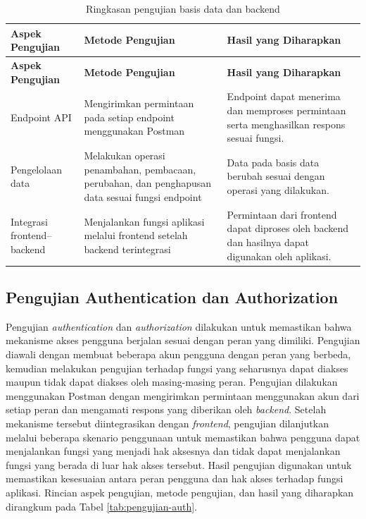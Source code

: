 \begin{longtable}{|p{3.2cm}|p{4.0cm}|p{4.0cm}|}
    \caption{Ringkasan pengujian basis data dan backend}
    \label{tab:pengujian-backend} \\
    \hline
    \textbf{Aspek Pengujian} & \textbf{Metode Pengujian} & \textbf{Hasil yang Diharapkan} \\
    \hline
    \endfirsthead

    \hline
    \textbf{Aspek Pengujian} & \textbf{Metode Pengujian} & \textbf{Hasil yang Diharapkan} \\
    \hline
    \endhead

    Endpoint API &
    Mengirimkan permintaan pada setiap endpoint menggunakan Postman &
    Endpoint dapat menerima dan memproses permintaan serta menghasilkan respons sesuai fungsi. \\
    \hline

    \hline
    Pengelolaan data &
    Melakukan operasi penambahan, pembacaan, perubahan, dan penghapusan data sesuai fungsi endpoint &
    Data pada basis data berubah sesuai dengan operasi yang dilakukan. \\
    \hline
    Integrasi frontend--backend &
    Menjalankan fungsi aplikasi melalui frontend setelah backend terintegrasi &
    Permintaan dari frontend dapat diproses oleh backend dan hasilnya dapat digunakan oleh aplikasi. \\
    \hline
\end{longtable}

\subsection{Pengujian Authentication dan Authorization}

Pengujian \textit{authentication} dan \textit{authorization} dilakukan untuk memastikan bahwa mekanisme akses pengguna berjalan sesuai dengan peran yang dimiliki. Pengujian diawali dengan membuat beberapa akun pengguna dengan peran yang berbeda, kemudian melakukan pengujian terhadap fungsi yang seharusnya dapat diakses maupun tidak dapat diakses oleh masing-masing peran. Pengujian dilakukan menggunakan Postman dengan mengirimkan permintaan menggunakan akun dari setiap peran dan mengamati respons yang diberikan oleh \textit{backend}. Setelah mekanisme tersebut diintegrasikan dengan \textit{frontend}, pengujian dilanjutkan melalui beberapa skenario penggunaan untuk memastikan bahwa pengguna dapat menjalankan fungsi yang menjadi hak aksesnya dan tidak dapat menjalankan fungsi yang berada di luar hak akses tersebut. Hasil pengujian digunakan untuk memastikan kesesuaian antara peran pengguna dan hak akses terhadap fungsi aplikasi. Rincian aspek pengujian, metode pengujian, dan hasil yang diharapkan dirangkum pada Tabel \ref{tab:pengujian-auth}.

